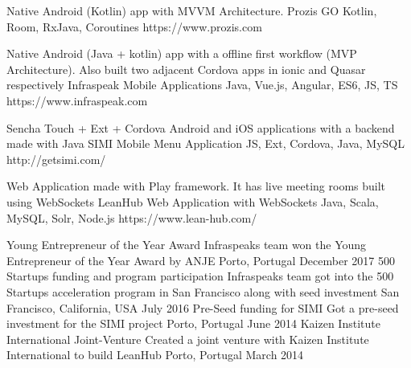 \documentclass[]{awesome-cv}
\begin{document}
\vspace{-10mm}
\begin{cventries}
 	\cventry
	{Native Android (Kotlin) app with MVVM Architecture. }
	{Prozis GO}
	{Kotlin, Room, RxJava, Coroutines}
	{https://www.prozis.com}
	{}
	
	\vspace{-5mm}
	\cventry
	{Native Android (Java + kotlin) app with a offline first workflow (MVP Architecture). Also built two adjacent Cordova apps in ionic and Quasar respectively}
	{Infraspeak Mobile Applications}
	{Java, Vue.js, Angular, ES6, JS, TS}
	{https://www.infraspeak.com}
	{}
	
	\vspace{-5mm}
	\cventry
	{Sencha Touch + Ext + Cordova Android and iOS applications with a backend made with Java}
	{SIMI Mobile Menu Application}
	{JS, Ext, Cordova, Java, MySQL}
	{http://getsimi.com/}
	{}
	
	\vspace{-5mm}
	\cventry
	{Web Application made with Play framework. It has live meeting rooms built using WebSockets}
	{LeanHub Web Application with WebSockets}
	{Java, Scala, MySQL, Solr, Node.js}
	{https://www.lean-hub.com/}
	{}
	
	\vspace{-5mm}
\end{cventries}
\begin{cvhonors}
	\cvhonor
	{Young Entrepreneur of the Year Award}
	{Infraspeak\textquotesingle{}s team won the Young Entrepreneur of the Year Award by ANJE}
	{Porto, Portugal}
	{December 2017}
	\cvhonor
	{500 Startups funding and program participation}
	{Infraspeak\textquotesingle{}s team got into the 500 Startups acceleration program in San Francisco along with seed investment}
	{San Francisco, California, USA}
	{July 2016}
	\cvhonor
	{Pre-Seed funding for SIMI}
	{Got a pre-seed investment for the SIMI project}
	{Porto, Portugal}
	{June 2014}
	\cvhonor
	{Kaizen Institute International Joint-Venture}
	{Created a joint venture with Kaizen Institute International to build LeanHub}
	{Porto, Portugal}
	{March 2014}
\end{cvhonors}
\ 
\end{document}
